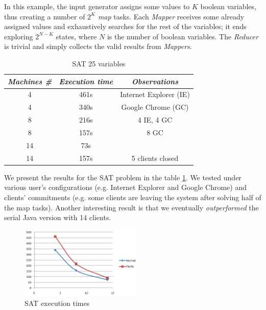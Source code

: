 \documentclass[letterpaper,twocolumn,10pt]{article}
\begin{document}
In this example, the input generator assigns some values to $K$ boolean
variables, thus creating a number of $2^K$ \textit{map} tasks. Each
\textit{Mapper} receives some already assigned values and exhaustively searches
for the rest of the variables; it ends exploring $2^{N - K}$ states, where $N$
is the number of boolean variables. The \textit{Reducer} is trivial and simply
collects the valid results from \textit{Mappers}.

\begin{table}
\begin{center}
  \begin{tabular}{| c | c | c |}
    \hline
      \textit{Machines \#} & \textit{Execution time} & \textit{Observations} \\
    \hline
      4 & 461s & {\small Internet Explorer (IE)} \\
    \hline
      4 & 340s & {\small Google Chrome (GC)} \\
    \hline
      8 & 216s & {\small 4 IE, 4 GC} \\
    \hline
      8 & 157s & {\small 8 GC} \\
    \hline
      14 & 73s & \\
    \hline
      14 & 157s & {\small 5 clients closed} \\
    \hline
  \end{tabular}
  \label{tab:sat25}
  \caption{SAT 25 variables}
\end{center}
\end{table}

We present the results for the SAT problem in the table \ref{tab:sat25}. We
tested under various user's configurations (e.g. Internet Explorer and Google
Chrome) and clients' commitments (e.g. some clients are leaving the system
after solving half of the map tasks). Another interesting result is that we
eventually \textit{outperformed} the serial Java version with 14 clients.

\begin{figure}[!ht]
\begin{center}
\includegraphics[width=220px]{../imgs/sat.png}
\end{center}
\caption{SAT execution times}
\label{fig:sat}
\end{figure}
\end{document}
